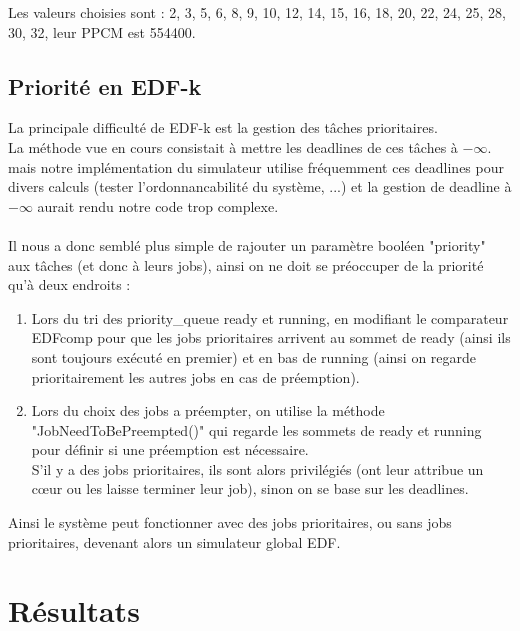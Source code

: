 \documentclass[a4paper,10pt]{article}
\begin{document}
		Les valeurs choisies sont : {2, 3, 5, 6, 8, 9, 10, 12, 14, 15, 16, 18, 20, 22, 24, 25, 28, 30, 32}, leur PPCM est 554400.

	\subsection{Priorité en EDF-k}\hypertarget{prioriteEDFk}{}

		La principale difficulté de EDF-k est la gestion des tâches prioritaires.\\
		La méthode vue en cours consistait à mettre les deadlines de ces tâches à $- \infty$. mais notre implémentation du simulateur utilise fréquemment ces deadlines pour divers calculs (tester l'ordonnancabilité du système, ...) et la gestion de deadline à $- \infty$ aurait rendu notre code trop complexe.\\
		~\\
		Il nous a donc semblé plus simple de rajouter un paramètre booléen "priority" aux tâches (et donc à leurs jobs), ainsi on ne doit se préoccuper de la priorité qu'à deux endroits :
		\begin{enumerate}
			\item Lors du tri des priority\_queue ready et running, en modifiant le comparateur EDFcomp pour que les jobs prioritaires arrivent au sommet de ready (ainsi ils sont toujours exécuté en premier) et en bas de running (ainsi on regarde prioritairement les autres jobs en cas de préemption).\\
			\item Lors du choix des jobs a préempter, on utilise la méthode "JobNeedToBePreempted()" qui regarde les sommets de ready et running pour définir si une préemption est nécessaire.\\
				S'il y a des jobs prioritaires, ils sont alors privilégiés (ont leur attribue un cœur ou les laisse terminer leur job), sinon on se base sur les deadlines.
		\end{enumerate}
		Ainsi le système peut fonctionner avec des jobs prioritaires, ou sans jobs prioritaires, devenant alors un simulateur global EDF.

\section{Résultats}
\end{document}
